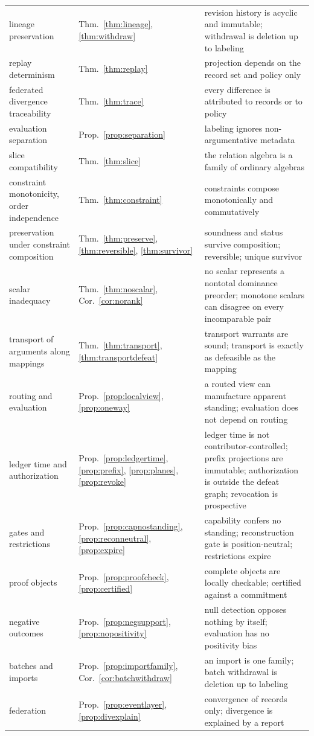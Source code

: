 {\begin{longtable}{@{}>{\raggedright\arraybackslash}p{} >{\raggedright\arraybackslash}p{} >{\raggedright\arraybackslash}p{}@{}}
lineage preservation & Thm.~\ref{thm:lineage}, \ref{thm:withdraw} & revision history is acyclic and immutable; withdrawal is deletion up to labeling\\
replay determinism & Thm.~\ref{thm:replay} & projection depends on the record set and policy only\\
federated divergence traceability & Thm.~\ref{thm:trace} & every difference is attributed to records or to policy\\
evaluation separation & Prop.~\ref{prop:separation} & labeling ignores non-argumentative metadata\\
slice compatibility & Thm.~\ref{thm:slice} & the relation algebra is a family of ordinary algebras\\
constraint monotonicity, order independence & Thm.~\ref{thm:constraint} & constraints compose monotonically and commutatively\\
preservation under constraint composition & Thm.~\ref{thm:preserve}, \ref{thm:reversible}, \ref{thm:survivor} & soundness and status survive composition; reversible; unique survivor\\
scalar inadequacy & Thm.~\ref{thm:noscalar}, Cor.~\ref{cor:norank} & no scalar represents a nontotal dominance preorder; monotone scalars can disagree on every incomparable pair\\
transport of arguments along mappings & Thm.~\ref{thm:transport}, \ref{thm:transportdefeat} & transport warrants are sound; transport is exactly as defeasible as the mapping\\
routing and evaluation & Prop.~\ref{prop:localview}, \ref{prop:oneway} & a routed view can manufacture apparent standing; evaluation does not depend on routing\\
ledger time and authorization & Prop.~\ref{prop:ledgertime}, \ref{prop:prefix}, \ref{prop:planes}, \ref{prop:revoke} & ledger time is not contributor-controlled; prefix projections are immutable; authorization is outside the defeat graph; revocation is prospective\\
gates and restrictions & Prop.~\ref{prop:capnostanding}, \ref{prop:reconneutral}, \ref{prop:expire} & capability confers no standing; reconstruction gate is position-neutral; restrictions expire\\
proof objects & Prop.~\ref{prop:proofcheck}, \ref{prop:certified} & complete objects are locally checkable; certified against a commitment\\
negative outcomes & Prop.~\ref{prop:negsupport}, \ref{prop:nopositivity} & null detection opposes nothing by itself; evaluation has no positivity bias\\
batches and imports & Prop.~\ref{prop:importfamily}, Cor.~\ref{cor:batchwithdraw} & an import is one family; batch withdrawal is deletion up to labeling\\
federation & Prop.~\ref{prop:eventlayer}, \ref{prop:divexplain} & convergence of records only; divergence is explained by a report\\
\bottomrule
\end{longtable}}
